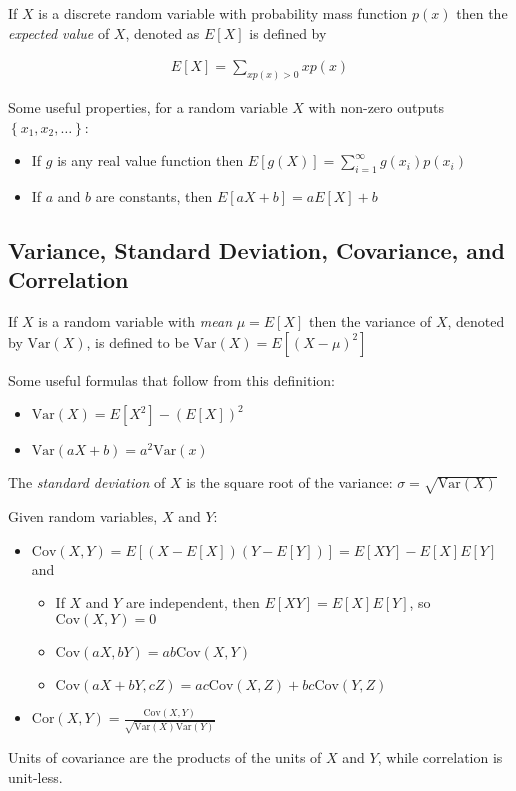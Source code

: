 \documentclass[10pt]{article}
\begin{document}
		If $X$ is a discrete random variable with probability mass function $p(x)$ then the \emph{expected value} of $X$, denoted as $E[X]$ is defined by
		
		\begin{align*}
			E[X] = \sum_{xp(x)>0}xp(x)
		\end{align*}
		
		Some useful properties, for a random variable $X$ with non-zero outputs $\left\{ x_1, x_2, \ldots \right\}$: 
		
		\begin{itemize}
			\item If $g$ is any real value function then $E[g(X)] =  \sum_{i=1}^{\infty}g(x_i)p(x_i)$
			\item If $a$ and $b$ are constants, then $E[aX+b] = aE[X] + b $
		\end{itemize}
		
		\subsection*{Variance, Standard Deviation, Covariance, and Correlation}
		
		If $X$ is a random variable with \emph{mean} $\mu=E[X]$ then the variance of $X$, denoted by $\text{Var}(X)$, is defined to be $\text{Var}(X) = E[(X-\mu)^2]$
		
		Some useful formulas that follow from this definition:
		\begin{multicols}{2}
			\begin{itemize}
				\item $\text{Var}(X) = E[X^2] - (E[X])^2$
				\item $\text{Var}(aX + b) = a^2 \text{Var}(x)$
			\end{itemize}
		\end{multicols}
		
		The \emph{standard deviation} of $X$ is the square root of the variance: $\sigma = \sqrt{\text{Var}(X)}$
		
		Given random variables, $X$ and $Y$:
		\begin{itemize}
			\item $\text{Cov}(X,Y)=E[(X-E[X])(Y-E[Y])]=E[XY]-E[X]E[Y]$ and
			\begin{itemize}
				\item If $X$ and $Y$ are independent, then $E[XY]=E[X]E[Y]$, so $\text{Cov}(X,Y) = 0$
				\item $\text{Cov}(aX,bY)=ab\text{Cov}(X,Y)$
				\item $\text{Cov}(aX+bY,cZ)=ac\text{Cov}(X,Z) + bc\text{Cov}(Y,Z)$
			\end{itemize}
			\item $\text{Cor}(X,Y) =\frac{ \text{Cov}(X,Y)}{\sqrt{\text{Var}(X)\text{Var}(Y)}}$
		\end{itemize} 
		Units of covariance are the products of the units of $X$ and $Y$, while correlation is unit-less.
		
\end{document}
